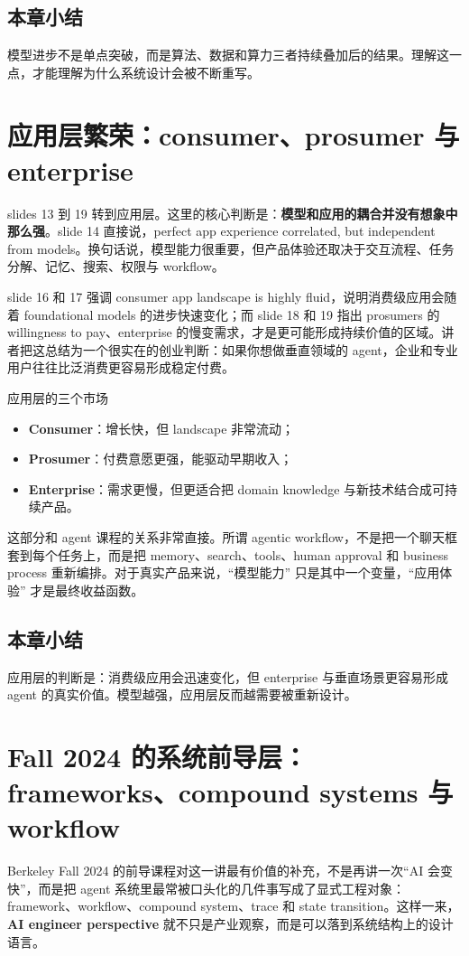 \documentclass[a4paper]{article}
\begin{document}
\subsection{本章小结}
模型进步不是单点突破，而是算法、数据和算力三者持续叠加后的结果。理解这一点，才能理解为什么系统设计会被不断重写。

\section{应用层繁荣：consumer、prosumer 与 enterprise}
slides 13 到 19 转到应用层。这里的核心判断是：\textbf{模型和应用的耦合并没有想象中那么强}。slide 14 直接说，perfect app experience correlated, but independent from models。换句话说，模型能力很重要，但产品体验还取决于交互流程、任务分解、记忆、搜索、权限与 workflow。

slide 16 和 17 强调 consumer app landscape is highly fluid，说明消费级应用会随着 foundational models 的进步快速变化；而 slide 18 和 19 指出 prosumers 的 willingness to pay、enterprise 的慢变需求，才是更可能形成持续价值的区域。讲者把这总结为一个很实在的创业判断：如果你想做垂直领域的 agent，企业和专业用户往往比泛消费更容易形成稳定付费。

\begin{importantbox}{应用层的三个市场}
\begin{itemize}
    \item \textbf{Consumer}：增长快，但 landscape 非常流动；
    \item \textbf{Prosumer}：付费意愿更强，能驱动早期收入；
    \item \textbf{Enterprise}：需求更慢，但更适合把 domain knowledge 与新技术结合成可持续产品。
\end{itemize}
\end{importantbox}

这部分和 agent 课程的关系非常直接。所谓 agentic workflow，不是把一个聊天框套到每个任务上，而是把 memory、search、tools、human approval 和 business process 重新编排。对于真实产品来说，``模型能力'' 只是其中一个变量，``应用体验'' 才是最终收益函数。

\subsection{本章小结}
应用层的判断是：消费级应用会迅速变化，但 enterprise 与垂直场景更容易形成 agent 的真实价值。模型越强，应用层反而越需要被重新设计。

\section{Fall 2024 的系统前导层：frameworks、compound systems 与 workflow}
Berkeley Fall 2024 的前导课程对这一讲最有价值的补充，不是再讲一次“AI 会变快”，而是把 agent 系统里最常被口头化的几件事写成了显式工程对象：framework、workflow、compound system、trace 和 state transition。这样一来，\textbf{AI engineer perspective} 就不只是产业观察，而是可以落到系统结构上的设计语言。
\end{document}
